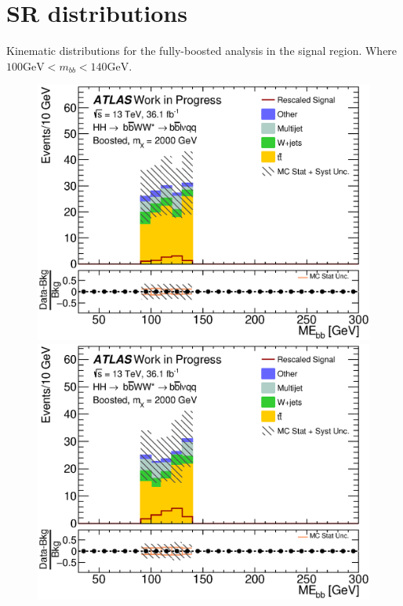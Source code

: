 \chapter{SR distributions}
\label{app:sr_john}
Kinematic distributions for the fully-boosted analysis in the signal region. Where ${100 \mathrm{GeV} < m_{bb} < 140 \mathrm{GeV}}$.
\begin{figure}[h]
\begin{center}
\includegraphics[scale=0.33]{figures/kinplots/C_2tag_SR_elec_presel_met50_HbbMass}
\includegraphics[scale=0.33]{figures/kinplots/C_2tag_SR_muon_presel_met50_HbbMass}\\

\end{center}
\end{figure}
